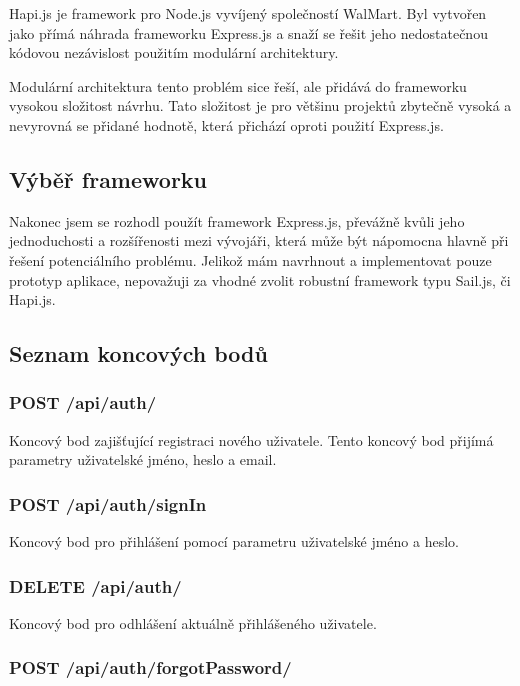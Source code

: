 Hapi.js je framework pro Node.js vyvíjený společností WalMart.
Byl vytvořen jako přímá náhrada frameworku Express.js a snaží se řešit jeho nedostatečnou kódovou nezávislost použitím modulární architektury.

Modulární architektura tento problém sice řeší, ale přidává do frameworku vysokou složitost návrhu.
Tato složitost je pro většinu projektů zbytečně vysoká a nevyrovná se přidané hodnotě, která přichází oproti použití Express.js.

\subsection{Výběř frameworku}\label{subsec:výběřFrameworku}

Nakonec jsem se rozhodl použít framework Express.js, převážně kvůli jeho jednoduchosti a rozšířenosti mezi vývojáři, která může být nápomocna hlavně při řešení potenciálního problému.
Jelikož mám navrhnout a implementovat pouze prototyp aplikace, nepovažuji za vhodné zvolit robustní framework typu Sail.js, či Hapi.js.

\subsection{Seznam koncových bodů}\label{subsec:seznamKoncovýchBodů}

\subsubsection{POST /api/auth/}

Koncový bod zajišťující registraci nového uživatele.
Tento koncový bod přijímá parametry uživatelské jméno, heslo a email.

\subsubsection{POST /api/auth/signIn}

Koncový bod pro přihlášení pomocí parametru uživatelské jméno a heslo.

\subsubsection{DELETE /api/auth/}

Koncový bod pro odhlášení aktuálně přihlášeného uživatele.

\subsubsection{POST /api/auth/forgotPassword/}

